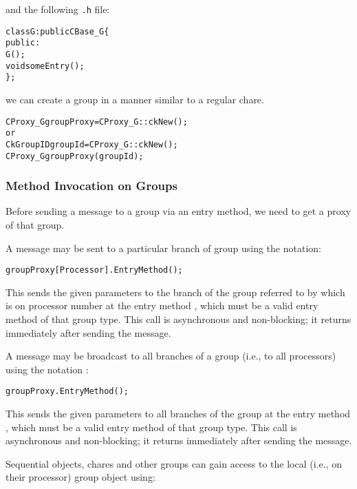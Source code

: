 and the following \texttt{.h} file:

\begin{alltt}
class G : public CBase\_G \{
  public:
    G();
    void someEntry();
\};
\end{alltt}

we can create a group in a manner similar to a regular
chare. 

\begin{alltt}
CProxy_G groupProxy = CProxy_G::ckNew();
or
CkGroupID groupId = CProxy_G::ckNew();
CProxy_G groupProxy(groupId);
\end{alltt}

\subsubsection{Method Invocation on Groups}

Before sending a message to a group via an entry
method, we need to get a proxy of that group.

A message may be sent to a particular branch of group using the
notation:

\begin{alltt}
 groupProxy[Processor].EntryMethod();
\end{alltt}

This sends the given parameters to the branch of
the group referred to by  which is on processor number
 at the entry method , which must be a valid
entry method of that group type. This call is asynchronous and non-blocking; it
returns immediately after sending the message.

A message may be broadcast  to all branches of a group
(i.e., to all processors) using the notation :

\begin{alltt}
 groupProxy.EntryMethod();
\end{alltt}

This sends the given parameters to all branches of the group at
the entry method , which must be a valid entry method of that
group type. This call is asynchronous and non-blocking; it returns immediately
after sending the message.


Sequential objects, chares and other groups can gain access to the local
(i.e., on their processor) group object using:

